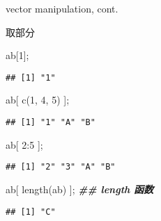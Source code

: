 \documentclass[ignorenonframetext,]{beamer}
\newenvironment{Shaded}{\begin{snugshade}}{\end{snugshade}}
\newcommand{\DecValTok}[1]{\textcolor[rgb]{0.00,0.00,0.81}{#1}}
\newcommand{\DocumentationTok}[1]{\textcolor[rgb]{0.56,0.35,0.01}{\textbf{\textit{#1}}}}
\newcommand{\FunctionTok}[1]{\textcolor[rgb]{0.00,0.00,0.00}{#1}}
\newcommand{\NormalTok}[1]{#1}
\newcommand{\SpecialCharTok}[1]{\textcolor[rgb]{0.00,0.00,0.00}{#1}}
\newcommand\FontSmall{\fontsize{7}{8}\selectfont}
\begin{document}
\begin{frame}[fragile]{vector manipulation, cont.}
\protect\hypertarget{vector-manipulation-cont.}{}
\begin{block}{取部分}
\protect\hypertarget{ux53d6ux90e8ux5206}{}
\FontSmall

\begin{Shaded}
\begin{Highlighting}[]
\NormalTok{ab[}\DecValTok{1}\NormalTok{];}
\end{Highlighting}
\end{Shaded}

\begin{verbatim}
## [1] "1"
\end{verbatim}

\begin{Shaded}
\begin{Highlighting}[]
\NormalTok{ab[ }\FunctionTok{c}\NormalTok{(}\DecValTok{1}\NormalTok{, }\DecValTok{4}\NormalTok{, }\DecValTok{5}\NormalTok{) ];}
\end{Highlighting}
\end{Shaded}

\begin{verbatim}
## [1] "1" "A" "B"
\end{verbatim}

\begin{Shaded}
\begin{Highlighting}[]
\NormalTok{ab[ }\DecValTok{2}\SpecialCharTok{:}\DecValTok{5}\NormalTok{ ];}
\end{Highlighting}
\end{Shaded}

\begin{verbatim}
## [1] "2" "3" "A" "B"
\end{verbatim}

\begin{Shaded}
\begin{Highlighting}[]
\NormalTok{ab[ }\FunctionTok{length}\NormalTok{(ab) ]; }\DocumentationTok{\#\# length 函数}
\end{Highlighting}
\end{Shaded}

\begin{verbatim}
## [1] "C"
\end{verbatim}
\end{block}
\end{frame}
\end{document}
